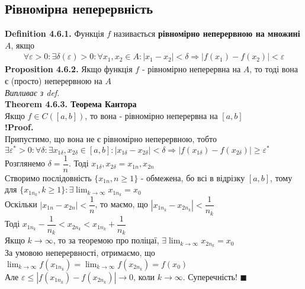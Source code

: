 \documentclass[a4paper, 14pt]{extarticle}
\def\huge{\displaystyle}
\def\bigline{\vspace{5mm}\\}
\def\defin#1{\textbf{Definition {#1}}}
\def\prp#1{\textbf{Proposition {#1}}}
\def\th#1{\textbf{Theorem {#1}}}
\def\contra{\textbf{!Proof.}\\}
\def\bigline{\vspace{5mm}\\}
\def\qed{$\blacksquare$}
\begin{document}
\subsection{Рівномірна неперервність}
\defin{4.6.1.} Функція $f$ називається \textbf{рівномірно неперервною на множині} $A$, якщо
\begin{align*}
\forall \varepsilon > 0: \exists \delta(\varepsilon) > 0: \forall x_1,x_2 \in A: |x_1-x_2|<\delta \Rightarrow |f(x_1) - f(x_2)| < \varepsilon
\end{align*}
\prp{4.6.2.} Якщо функція $f$ - рівномірно неперервна на $A$, то тоді вона є (просто) неперервною на $A$\\
\textit{Випливає з def.}
\bigline
\th{4.6.3. Теорема Кантора}\\
Якщо $f \in C([a,b])$, то вона - рівномірно неперервна на $[a,b]$\\
\contra
Припустимо, що вона не є рівномірно неперервною, тобто\\
$\exists \varepsilon^* > 0: \forall \delta: \exists x_{1 \delta}, x_{2 \delta} \in [a,b]: |x_{1 \delta} - x_{2 \delta}| < \delta \Rightarrow |f(x_{1 \delta}) - f(x_{2 \delta})| \geq \varepsilon^*$\\
Розглянемо $\delta = \dfrac{1}{n}$. Тоді $x_{1 \delta}, x_{2 \delta} = x_{1n}, x_{2n}$\\
Створимо послідовність $\{x_{1n}, n \geq 1\}$ - обмежена, бо всі в відрізку $[a,b]$, тому \\ 
для $\{x_{{1n}_k}, k \geq 1\}: \exists \huge \lim_{k \to \infty} x_{{1n}_k} = x_0$\\
Оскільки $|x_{1n} - x_{2n}| < \dfrac{1}{n}$, то маємо, що $|x_{1n_k} - x_{2n_k}| < \dfrac{1}{n_k}$\\
Тоді $x_{1n_k} - \dfrac{1}{n_k} < x_{2n_k} < x_{1n_k} + \dfrac{1}{n_k}$\\
Якщо $k \to \infty$, то за теоремою про поліцаї, $\exists \huge \lim_{k \to \infty} x_{2n_k} = x_0$\\
За умовою неперервності, отримаємо, що $\huge\lim_{k \to \infty} f(x_{1n_k}) = \lim_{k \to \infty} f(x_{2n_k}) = f(x_0)$\\
Але $\varepsilon \leq |f(x_{1n_k}) - f(x_{2n_k})| \to 0$, коли $k \to \infty$. Суперечність! \qed
\newpage
\end{document}
